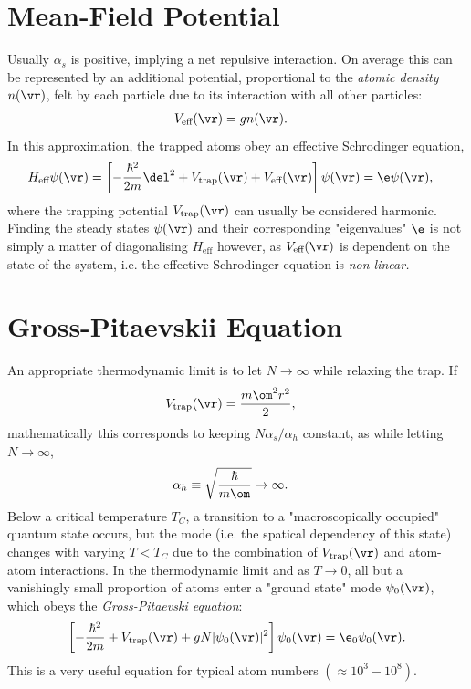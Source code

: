 \documentclass[qo.tex]{subfiles}
\begin{document}
\section{Mean-Field Potential}
Usually $\alpha_s$ is positive, implying a net repulsive interaction. 
On average this can be represented by an additional potential, proportional to the \emph{atomic density} $n(\vr)$, felt by each particle due to its interaction with all other particles:
\begin{align}
    V_{\text{eff}}(\vr) &= gn(\vr).
\end{align}
In this approximation, the trapped atoms obey an effective Schrodinger equation,
\begin{align}
    H_{\text{eff}}\psi(\vr) &= \left[-\frac{\hbar^2}{2m}\del^2 + V_{\text{trap}}(\vr) + V_{\text{eff}}(\vr)\right] \psi(\vr) = \e\psi(\vr),
\end{align}
where the trapping potential $V_{\text{trap}}(\vr)$ can usually be considered harmonic. 
Finding the steady states $\psi(\vr)$ and their corresponding "eigenvalues" $\e$ is not simply a matter of diagonalising $H_{\text{eff}}$ however, as $V_{\text{eff}}(\vr)$ is dependent on the state of the system, i.e. the effective Schrodinger equation is \emph{non-linear.}

\section{Gross-Pitaevskii Equation}
An appropriate thermodynamic limit is to let $N\to\infty$ while relaxing the trap.
If 
\begin{align}
    V_{\text{trap}}(\vr) &= \frac{m\om^2 r^2}{2},
\end{align}
mathematically this corresponds to keeping $N\alpha_s/\alpha_h$ constant, as while letting $N\to\infty$,
\begin{align}
    \alpha_h &\equiv \sqrt{\frac{\hbar}{m\om}}\to\infty.
\end{align}
Below a critical temperature $T_C$, a transition to a "macroscopically occupied" quantum state occurs, but the mode (i.e. the spatical dependency of this state) changes with varying $T<T_C$ due to the combination of $V_{\text{trap}}(\vr)$ and atom-atom interactions.
In the thermodynamic limit and as $T\to0$, all but a vanishingly small proportion of atoms enter a "ground state" mode $\psi_0(\vr)$, which obeys the \emph{Gross-Pitaevski equation}:
\begin{align}
    \left[-\frac{\hbar^2}{2m}+V_{\text{trap}}(\vr)+gN|\psi_0(\vr)|^2\right]\psi_0(\vr) = \e_0\psi_0(\vr).
\end{align}
This is a very useful equation for typical atom numbers $(\approx 10^3-10^8)$.
\end{document}
